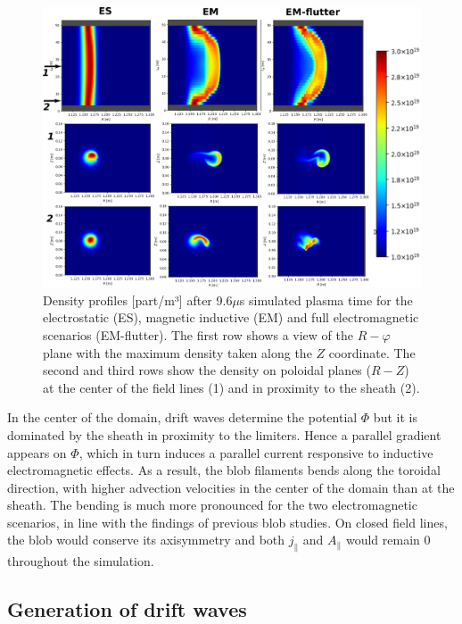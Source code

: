 \begin{figure}[H]\centering
	\centering
	\includegraphics[width=1.\textwidth]{schemes/blob_compare_9_6_microsec.png}
	\caption{Density profiles [part/m³] after 9.6$\mu$s simulated plasma time for the electrostatic (ES), magnetic inductive (EM) and full electromagnetic scenarios (EM-flutter). The first row shows a view of the $R-\varphi$ plane with the maximum density taken along the $Z$ coordinate. The second and third rows show the density on poloidal planes ($R-Z$) at the center of the field lines (1) and in proximity to the sheath (2).}
	\label{fig:BLOB}
\end{figure}

In the center of the domain, drift waves determine the potential $\Phi$ but it is dominated by the sheath in proximity to the limiters. Hence a parallel gradient appears on $\Phi$, which in turn induces a parallel current responsive to inductive electromagnetic effects. As a result, the blob filaments bends along the toroidal direction, with higher advection velocities in the center of the domain than at the sheath. The bending is much more pronounced for the two electromagnetic scenarios, in line with the findings of previous blob studies\cite{lee2015,lee2015electromagnetic,Stepanenko_2020}. On closed field lines, the blob would conserve its axisymmetry and both $j_\parallel$ and $A_\parallel$ would remain 0 throughout the simulation. \newline




\subsection{Generation of drift waves}
\label{ssec:plasmaturbslab}

